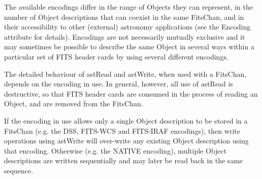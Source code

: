 \documentclass[twoside,11pt]{article}
\begin{document}
{{      The available encodings differ in the range of Objects they can
      represent, in the number of Object descriptions that can coexist
      in the same FitsChan, and in their accessibility to other
      (external) astronomy applications (see the Encoding attribute
      for details). Encodings are not necessarily mutually exclusive
      and it may sometimes be possible to describe the same Object in
      several ways within a particular set of FITS header cards by
      using several different encodings.

      The detailed behaviour of astRead and astWrite, when used with
      a FitsChan, depends on the encoding in use. In general, however,
      all use of astRead is destructive, so that FITS header cards
      are consumed in the process of reading an Object, and are
      removed from the FitsChan.

      If the encoding in use allows only a single Object description
      to be stored in a FitsChan (e.g. the DSS, FITS-WCS and FITS-IRAF
      encodings), then write operations using astWrite will
      over-write any existing Object description using that
      encoding. Otherwise (e.g. the NATIVE encoding), multiple Object
      descriptions are written sequentially and may later be read
      back in the same sequence.
   }
   }
\end{document}
